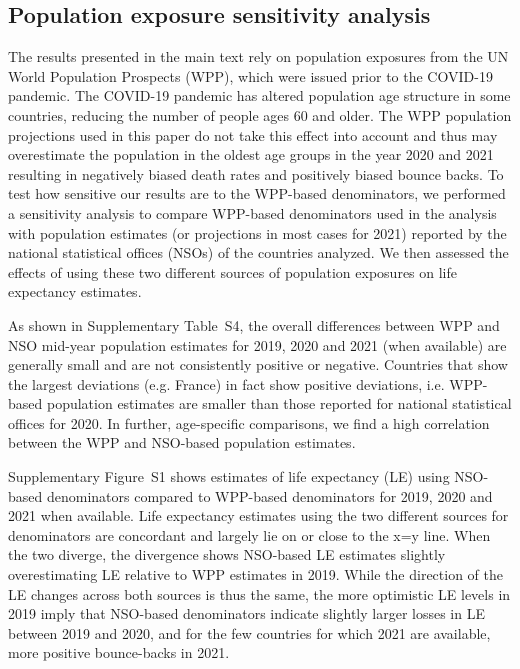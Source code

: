 \documentclass[12pt]{article}
\begin{document}
\subsection*{Population exposure sensitivity analysis}

The results presented in the main text rely on population exposures from the UN World Population Prospects (WPP), which were issued prior to the COVID-19 pandemic. The COVID-19 pandemic has altered population age structure in some countries, reducing the number of people ages 60 and older. The WPP population projections used in this paper do not take this effect into account and thus may overestimate the population in the oldest age groups in the year 2020 and 2021 resulting in negatively biased death rates and positively biased bounce backs. To test how sensitive our results are to the WPP-based denominators, we performed a sensitivity analysis to compare WPP-based denominators used in the analysis with population estimates (or projections in most cases for 2021) reported by the national statistical offices (NSOs) of the countries analyzed. We then assessed the effects of using these two different sources of population exposures on life expectancy estimates.

As shown in Supplementary Table~S4, the overall differences between WPP and NSO mid-year population estimates for 2019, 2020 and 2021 (when available) are generally small and are not consistently positive or negative. Countries that show the largest deviations (e.g. France) in fact show positive deviations, i.e. WPP-based population estimates are smaller than those reported for national statistical offices for 2020. In further, age-specific comparisons, we find a high correlation between the WPP and NSO-based population estimates.

Supplementary Figure~S1 shows estimates of life expectancy (LE) using NSO-based denominators compared to WPP-based denominators for 2019, 2020 and 2021 when available. Life expectancy estimates using the two different sources for denominators are concordant and largely lie on or close to the x=y line. When the two diverge, the divergence shows NSO-based LE estimates slightly overestimating LE relative to WPP estimates in 2019. While the direction of the LE changes across both sources is thus the same, the more optimistic LE levels in 2019 imply that NSO-based denominators indicate slightly larger losses in LE between 2019 and 2020, and for the few countries for which 2021 are available, more positive bounce-backs in 2021.
\end{document}
